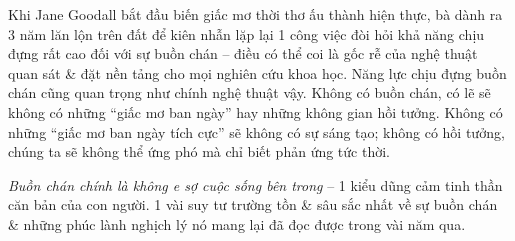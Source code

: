 \documentclass{article}
\begin{document}
Khi {\sc Jane Goodall} bắt đầu biến giấc mơ thời thơ ấu thành hiện thực, bà dành ra 3 năm lăn lộn trên đất để kiên nhẫn lặp lại 1 công việc đòi hỏi khả năng chịu đựng rất cao đối với sự buồn chán -- điều có thể coi là gốc rễ của nghệ thuật quan sát \& đặt nền tảng cho mọi nghiên cứu khoa học. Năng lực chịu đựng buồn chán cũng quan trọng như chính nghệ thuật vậy. Không có buồn chán, có lẽ sẽ không có những ``giấc mơ ban ngày'' hay những không gian hồi tưởng. Không có những ``giấc mơ ban ngày tích cực'' sẽ không có sự sáng tạo; không có hồi tưởng, chúng ta sẽ không thể ứng phó mà chỉ biết phản ứng tức thời.

{\it Buồn chán chính là không e sợ cuộc sống bên trong} -- 1 kiểu dũng cảm tinh thần căn bản của con người. 1 vài suy tư trường tồn \& sâu sắc nhất về sự buồn chán \& những phúc lành nghịch lý nó mang lại đã đọc được trong vài năm qua.
\end{document}
